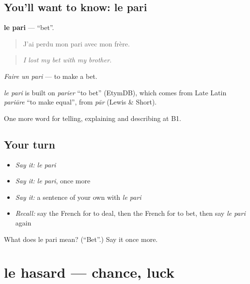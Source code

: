 \subsection*{You'll want to know: le pari}
\textbf{le pari} — \textquotedblleft{}bet\textquotedblright{}.

\begin{quote}
J'ai perdu mon pari avec mon frère.
\end{quote}

\begin{quote}
\emph{I lost my bet with my brother.}
\end{quote}

\emph{Faire un pari} — to make a bet.

\begin{cousinweb}
\emph{le pari} is built on \emph{parier} \textquotedblleft{}to bet\textquotedblright{} (EtymDB), which comes from Late Latin \emph{pariāre} \textquotedblleft{}to make equal\textquotedblright{}, from \emph{pār} (Lewis \& Short).
\end{cousinweb}

\begin{grammarlens}[title={What you've built}]
One more word for telling, explaining and describing at B1.
\end{grammarlens}

\subsection*{Your turn}
\begin{itemize}
\raggedright
  \item \emph{Say it:} \emph{le pari}
  \item \emph{Say it:} \emph{le pari}, once more
  \item \emph{Say it:} a sentence of your own with \emph{le pari}
  \item \emph{Recall:} say the French for to deal, then the French for to bet, then say \emph{le pari} again
\end{itemize}

\begin{tcolorbox}[breakable,colback=teal!4,colframe=teal!35!black,title={Before you move on}]
What does le pari mean? (\textquotedblleft{}Bet\textquotedblright{}.) Say it once more.
\end{tcolorbox}
\section[le hasard]{le hasard — chance, luck}

